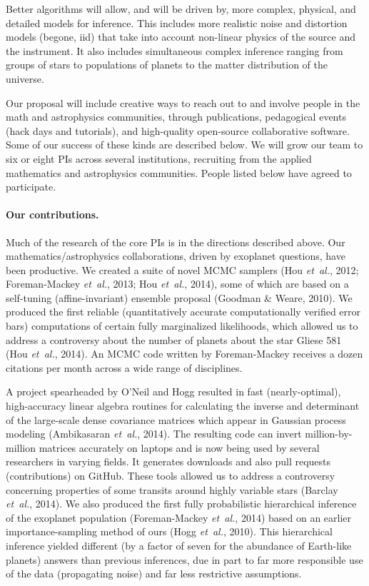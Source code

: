 \documentclass[12pt]{article}
\newcommand{\foreign}[1]{\textsl{#1}}
\newcommand{\etal}{\foreign{et~al.}}
\begin{document}
Better algorithms will allow, and will be driven by, more complex, physical, and
detailed models for inference.
This includes more realistic noise and distortion models (begone, iid)
that take into account non-linear physics of the source
and the instrument.
It also includes simultaneous complex inference ranging from groups of stars to
populations of planets to the matter distribution of the universe.

Our proposal will include creative ways to reach out to and involve people in
the math and astrophysics communities,
through publications, pedagogical events (hack days and tutorials), and high-quality open-source
collaborative software.
Some of our success of these kinds are described below.
We will grow our team to six or eight PIs across several institutions, 
recruiting from the applied mathematics and astrophysics communities.
People listed below have agreed to participate.

\paragraph{Our contributions.}

Much of the research of the core PIs is in the directions described above.
Our mathematics/astrophysics collaborations, driven by exoplanet questions,
have been productive.
We created a suite of novel MCMC samplers 
(Hou \etal, 2012; Foreman-Mackey \etal, 2013; Hou \etal,
2014), some of which are based on a self-tuning (affine-invariant)
ensemble proposal (Goodman \& Weare, 2010).
We produced the first reliable (quantitatively accurate computationally 
verified error bars) computations of certain fully
marginalized likelihoods, which allowed us to address a controversy
about the number of planets about the star Gliese 581 (Hou \etal, 2014).
An MCMC code written by Foreman-Mackey receives a dozen
citations per month across a wide range of disciplines.

A project spearheaded by O'Neil and Hogg resulted in
fast (nearly-optimal), high-accuracy linear algebra
routines for calculating the inverse and determinant of the large-scale
dense covariance matrices which appear in Gaussian process modeling
(Ambikasaran \etal, 2014).
The resulting code can invert million-by-million matrices
accurately on laptops and is now being used by
several researchers in varying fields.
It generates downloads and also pull requests (contributions) 
on GitHub.
These tools allowed us to address a controversy concerning properties 
of some transits around highly variable stars (Barclay \etal, 2014).
We also produced the first fully probabilistic hierarchical inference of
the exoplanet population (Foreman-Mackey \etal, 2014) based on an
earlier importance-sampling method of ours (Hogg \etal, 2010).
This hierarchical inference yielded different (by a factor of seven for
the abundance of Earth-like planets) answers than previous inferences,
due in part to far more responsible use of the data (propagating noise)
and far less restrictive assumptions.
\end{document}
